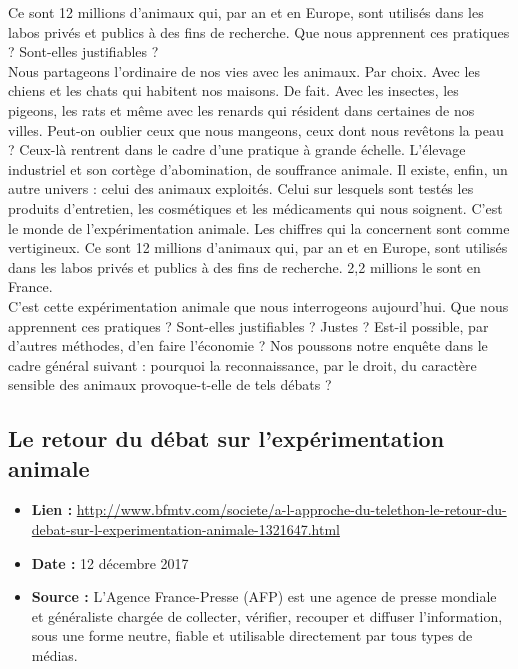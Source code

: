 \documentclass[10pt]{article}
\begin{document}
Ce sont 12 millions d’animaux qui, par an et en Europe, sont utilisés dans les labos privés et publics à des fins de recherche. Que nous apprennent ces pratiques ? Sont-elles justifiables ?\\

Nous partageons l’ordinaire de nos vies avec les animaux. Par choix. Avec les chiens et les chats qui habitent nos maisons. De fait. Avec les insectes, les pigeons, les rats et même avec les renards qui résident dans certaines de nos villes. Peut-on oublier ceux que nous mangeons, ceux dont nous revêtons la peau ? Ceux-là rentrent dans le cadre d’une pratique à grande échelle. L’élevage industriel et son cortège d’abomination, de souffrance animale. Il existe, enfin, un autre univers : celui des animaux exploités. Celui sur lesquels sont testés les produits d’entretien, les cosmétiques et les médicaments qui nous soignent. C’est le monde de l’expérimentation animale. Les chiffres qui la concernent sont comme vertigineux. Ce sont 12 millions d’animaux qui, par an et en Europe, sont utilisés dans les labos privés et publics à des fins de recherche. 2,2 millions le sont en France.\\

 C’est cette expérimentation animale que nous interrogeons aujourd’hui. Que nous apprennent ces pratiques ? Sont-elles justifiables ? Justes ? Est-il possible, par d’autres méthodes, d’en faire l’économie ? Nos poussons notre enquête dans le cadre général suivant : pourquoi la reconnaissance, par le droit, du caractère sensible des animaux provoque-t-elle de tels débats ?
\newpage
\subsection{Le retour du débat sur l'expérimentation animale}
\begin{itemize}
	\item \textbf{Lien : }  \url{http://www.bfmtv.com/societe/a-l-approche-du-telethon-le-retour-du-debat-sur-l-experimentation-animale-1321647.html} 
	\item \textbf{Date : }  12 décembre 2017
	\item \textbf{Source : }  L’Agence France-Presse (AFP) est une agence de presse mondiale et généraliste chargée de collecter, vérifier, recouper et diffuser l'information, sous une forme neutre, fiable et utilisable directement par tous types de médias.
\end{itemize}
\end{document}
